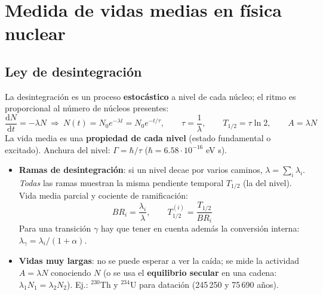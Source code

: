 \chapter{Medida de vidas medias en física nuclear}

\section{Ley de desintegración}
\begin{clave}
La desintegración es un proceso \textbf{estocástico} a nivel de cada núcleo; el ritmo es proporcional al número de núcleos presentes:
\[
\frac{\mathrm{d}N}{\mathrm{d}t}=-\lambda N\ \Rightarrow\ N(t)=N_0e^{-\lambda t}=N_0e^{-t/\tau},\qquad
\tau=\frac1\lambda,\qquad T_{1/2}=\tau\ln2,\qquad A=\lambda N
\]
La vida media es una \textbf{propiedad de cada nivel} (estado fundamental o excitado). Anchura del nivel: $\Gamma=\hbar/\tau$
($\hbar=6.58\cdot10^{-16}$ eV s).
\end{clave}
\begin{itemize}
\item \textbf{Ramas de desintegración}: si un nivel decae por varios caminos, $\lambda=\sum_i\lambda_i$. \emph{Todas} las ramas muestran la misma
pendiente temporal $T_{1/2}$ (la del nivel). Vida media parcial y cociente de ramificación:
\[ BR_i=\frac{\lambda_i}{\lambda},\qquad T_{1/2}^{(i)}=\frac{T_{1/2}}{BR_i} \]
Para una transición $\gamma$ hay que tener en cuenta además la conversión interna: $\lambda_\gamma=\lambda_i/(1+\alpha)$.
\item \textbf{Vidas muy largas}: no se puede esperar a ver la caída; se mide la actividad $A=\lambda N$ conociendo $N$ (o se usa el
\textbf{equilibrio secular} en una cadena: $\lambda_1N_1=\lambda_2N_2$). Ej.: $^{230}$Th y $^{234}$U para datación (245\,250 y 75\,690 años).
\end{itemize}


